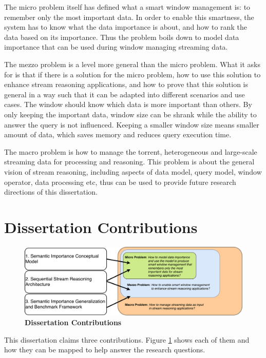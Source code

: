 The micro problem itself has defined what a smart window management is: to remember only the most important data. 
In order to enable this smartness, the system has to know what the data importance is about, and how to rank the data based on its importance. 
Thus the problem boils down to model data importance that can be used during window managing streaming data. 

The mezzo problem is a level more general than the micro problem.
What it asks for is that if there is a solution for the micro problem, how to use this solution to enhance stream reasoning applications, and how to prove that this solution is general in a way such that it can be adapted into different scenarios and use cases. 
The window should know which data is more important than others. 
By only keeping the important data, window size can be shrank while the ability to answer the query is not influenced.
Keeping a smaller window size means smaller amount of data, which saves memory and reduces query execution time. 

The macro problem is how to manage the torrent, heterogeneous and large-scale streaming data for processing and reasoning. 
This problem is about the general vision of stream reasoning, including aspects of data model, query model, window operator, data processing etc, thus can be used to provide future research directions of this dissertation.  
%
\section{Dissertation Contributions}

\begin{figure}[!htbp]
	\centering
    \includegraphics[width=5in]{img/1-dc.pdf}
    \caption{\textbf{Dissertation Contributions}}
    \label{fig:1-dc}
\end{figure}

This dissertation claims three contributions.
Figure \ref{fig:1-dc} shows each of them and how they can be mapped to help answer the research questions.

